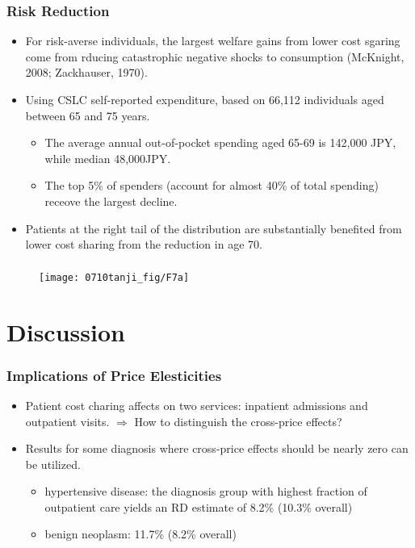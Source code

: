 \documentclass[dvipdfmx,11pt]{beamer}
\begin{document}
\begin{frame}\frametitle{Risk Reduction}
  \begin{itemize}
    \item For risk-averse individuals, the largest welfare gains from lower cost sgaring come from rducing catastrophic negative shocks to consumption (McKnight, 2008; Zackhauser, 1970).
    \item Using CSLC self-reported expenditure, based on 66,112 individuals aged between 65 and 75 years.
    \begin{itemize}
      \item The average annual out-of-pocket spending aged 65-69 is 142,000 JPY, while median 48,000JPY.
      \item The top 5\% of spenders (account for almost 40\% of total spending) receove the largest decline.
    \end{itemize}
    \item Patients at the right tail of the distribution are substantially benefited from lower cost sharing from the reduction in age 70.
  \end{itemize}
\end{frame}

\begin{frame}\frametitle{}
  \begin{figure}[ht]
    \centering
    \texttt{[image: 0710tanji\_fig/F7a]}
  \end{figure}
\end{frame}

\section{Discussion}
\frame{\sectionpage}

\begin{frame}\frametitle{Implications of Price Elesticities}
  \begin{itemize}
    \item Patient cost charing affects on two services: inpatient admissions and outpatient visits.
    $\Rightarrow$ How to distinguish the cross-price effects?
    \item Results for some diagnosis where cross-price effects should be nearly zero can be utilized.
    \begin{itemize}
      \item hypertensive disease: the diagnosis group with highest fraction of outpatient care yields an RD estimate of 8.2\% (10.3\% overall)
      \item benign neoplasm: 11.7\% (8.2\% overall)
    \end{itemize}
  \end{itemize}
\end{frame}
\end{document}
